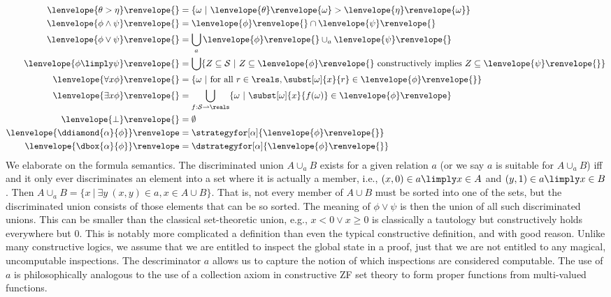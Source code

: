 \documentclass[12pt]{cmuthesis}
\theoremstyle{definition}
\theoremstyle{remark}
\newcommand{\allstate}{\mathcal{S}}
\newcommand{\om}{\omega}
\newcommand{\tint}[2]{\lenvelope{#1}\renvelope{#2}}
\newcommand{\fint}[1]{\lenvelope{#1}\renvelope}
\begin{document}
\begin{align*}
  \fint{\theta > \eta}{}         &= \{\om~|~\tint{\theta}{\om} > \tint{\eta}{\om}\}\\
  \fint{\phi \land \psi}{}       &= \fint{\phi}{} \cap \fint{\psi}{}\\
  \fint{\phi \lor \psi}{}        &=\bigcup_a \fint{\phi}{} \cup_a \fint{\psi}{}\\
  \fint{\phi \limply \psi}{}     &= \bigcup\{Z \subseteq \allstate ~|~ Z\subseteq\fint{\phi}{}\text{ constructively implies }Z\subseteq\fint{\psi}{}\}\\
  \fint{\forall{x}{\phi}}{}      &= \{\om~|~\text{for all }r\in\reals, \subst[\om]{x}{r}\in\fint{\phi}{}\}\\
  \fint{\exists{x}{\phi}}{}      &= \bigcup_{f:\allstate\mto \reals}\{\om~|~\subst[\om]{x}{f(\om)}\in\fint{\phi}\}\\
  \fint{\bot}{}                  &= \emptyset  \\
  \fint{\ddiamond{\alpha}{\phi}} &= \strategyfor[\alpha]{\fint{\phi}{}}\\
  \fint{\dbox{\alpha}{\phi}}     &= \dstrategyfor[\alpha]{\fint{\phi}{}}
\end{align*}
We elaborate on the formula semantics.
The discriminated union $A \cup_a B$ exists for a given relation $a$ (or we say $a$ is suitable for $A \cup_a B$) iff 
and it only ever discriminates an element into a set where it is actually a member, i.e., $(x,0) \in a \limply x \in A$ and $(y,1) \in a \limply x \in B$.
Then $A \cup_a B = \{x~|~ \exists y~(x,y) \in a, x \in A \cup B\}$.
That is, not every member of $A \cup B$ must be sorted into one of the sets, but the discriminated union consists of those elements that can be so sorted.
The meaning of $\phi \lor \psi$ is then the union of all such discriminated unions.
This can be smaller than the classical set-theoretic union, e.g., $x < 0 \lor x \geq 0$ is classically a tautology but constructively holds everywhere but 0.
This is notably more complicated a definition than even the typical constructive definition, and with good reason.
Unlike many constructive logics, we assume that we are entitled to inspect the global state in a proof, just that we are not entitled to any magical, uncomputable inspections.
The descriminator $a$ allows us to capture the notion of which inspections are considered computable.
The use of $a$ is philosophically analogous to the use of a collection axiom in constructive ZF set theory to form proper functions from multi-valued functions.
\end{document}

